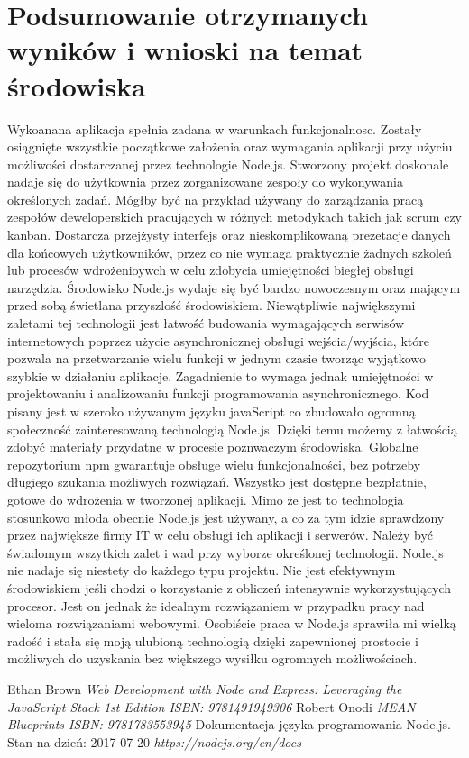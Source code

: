 \documentclass[12pt]{report}
\begin{document}
\chapter{Podsumowanie otrzymanych wyników i wnioski na temat środowiska}
Wykoanana aplikacja spełnia zadana w warunkach funkcjonalnosc. 
Zostały osiągnięte wszystkie początkowe założenia oraz wymagania aplikacji przy użyciu możliwości dostarczanej przez technologie Node.js. 
Stworzony projekt doskonale nadaje się do użytkownia przez zorganizowane zespoły do wykonywania określonych zadań. 
Mógłby być na przykład używany do zarządzania pracą zespołów deweloperskich pracujących w różnych metodykach takich jak scrum czy kanban. 
Dostarcza przejżysty interfejs oraz nieskomplikowaną prezetacje danych dla końcowych użytkowników, przez co nie wymaga praktycznie żadnych szkoleń lub procesów wdrożenioywch w celu zdobycia umiejętności biegłej obsługi narzędzia. 
Środowisko Node.js wydaje się być bardzo nowoczesnym oraz mającym przed sobą świetlana przyszlość środowiskiem. 
Niewątpliwie największymi zaletami tej technologii jest łatwość budowania wymagających serwisów internetowych poprzez użycie asynchronicznej obsługi wejścia/wyjścia, które pozwala na przetwarzanie wielu funkcji w jednym czasie tworząc wyjątkowo szybkie w działaniu aplikacje. 
Zagadnienie to wymaga jednak umiejętności w projektowaniu i analizowaniu funkcji programowania asynchronicznego. 
Kod pisany jest w szeroko używanym języku javaScript co zbudowało ogromną społeczność zainteresowaną technologią Node.js. 
Dzięki temu możemy z łatwością zdobyć materiały przydatne w procesie poznwaczym środowiska. 
Globalne repozytorium npm gwarantuje obsługe wielu funkcjonalności, bez potrzeby długiego szukania możliwych rozwiązań. 
Wszystko jest dostępne bezpłatnie, gotowe do wdrożenia w tworzonej aplikacji. 
Mimo że jest to technologia stosunkowo młoda obecnie Node.js jest używany, a co za tym idzie sprawdzony przez największe firmy IT w celu obsługi ich aplikacji i serwerów. 
Należy być świadomym wszytkich zalet i wad przy wyborze określonej technologii. 
Node.js nie nadaje się niestety do każdego typu projektu. 
Nie jest efektywnym środowiskiem jeśli chodzi o korzystanie z obliczeń intensywnie wykorzystujących procesor. 
Jest on jednak że idealnym rozwiązaniem w przypadku pracy nad wieloma rozwiązaniami webowymi. 
Osobiście praca w Node.js sprawiła mi wielką radość i stała się moją ulubioną technologią dzięki zapewnionej prostocie i możliwych do uzyskania bez większego wysiłku ogromnych możliwościach.

\begin{thebibliography}{99}
Ethan Brown
\textit{Web Development with Node and Express: Leveraging the JavaScript Stack 1st Edition ISBN: 9781491949306}
Robert Onodi
\textit{MEAN Blueprints ISBN: 9781783553945}
Dokumentacja języka programowania Node.js. Stan na dzień: 2017-07-20
\textit{https://nodejs.org/en/docs}

\end{thebibliography}

\listoffigures
\end{document}
